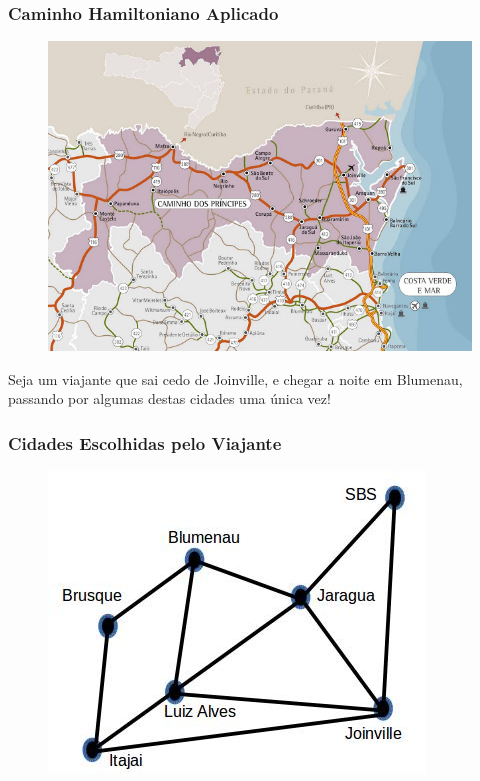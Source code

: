 \begin{frame}[fragile]
\frametitle{Caminho Hamiltoniano Aplicado}

\begin{figure}[!htb]
\centering
\includegraphics[width=.8\textwidth, height=0.567\textheight]{figures/mapa-norte-santa-catarina.jpg}
\end{figure}

Seja um viajante que sai cedo de Joinville, e chegar a noite
em Blumenau, passando por algumas destas cidades uma única vez!

\end{frame}


\begin{frame}[fragile]
\frametitle{Cidades Escolhidas pelo Viajante}

\begin{figure}[!htb]
\centering
\includegraphics[width=.8\textwidth, height=0.567\textheight]{figures/mapa01SC.jpg}
\end{figure}

\end{frame}




